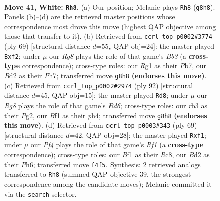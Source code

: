 \documentclass[11pt]{article}
\begin{document}
\begin{figure}[p]\centering
\begin{subfigure}{0.46\textwidth}\centering
\resizebox{\linewidth}{!}{%
\newchessgame
\chessboard[
  setfen={4n1R1/p1p1k3/2P2p2/8/4rP1p/1r6/3B3P/3K1BR1 w - - 0 41},
  showmover=false,
  pgfstyle=straightmove, color=movearrow, markmove={g8-h8}
]}
\caption{}
\end{subfigure}\hfill
\begin{subfigure}{0.46\textwidth}\centering
\resizebox{\linewidth}{!}{%
\newchessgame
\chessboard[
  setfen={8/1p1k3p/1b1r2p1/3P1p2/1P6/1K1P2P1/5NBP/2R5 b - - 0 35},
  showmover=false,
  pgfstyle=straightmove, color=movearrow, markmove={b6-f2}
]}
\caption{}
\end{subfigure}
\\[4pt]
\begin{subfigure}{0.46\textwidth}\centering
\resizebox{\linewidth}{!}{%
\newchessgame
\chessboard[
  setfen={8/6k1/3R1r2/1pn2p1B/p4P1p/P6P/1r4P1/3R2K1 w - - 3 47},
  showmover=false,
  pgfstyle=straightmove, color=movearrow, markmove={d6-d8}
]}
\caption{}
\end{subfigure}\hfill
\begin{subfigure}{0.46\textwidth}\centering
\resizebox{\linewidth}{!}{%
\newchessgame
\chessboard[
  setfen={2r2rk1/8/3p3p/1p2b3/1P1pP3/3N2P1/R5KP/5R2 b - - 4 35},
  showmover=false,
  pgfstyle=straightmove, color=movearrow, markmove={f8-f1}
]}
\caption{}
\end{subfigure}
\caption{\textbf{Move 41, White: \texttt{Rh8}.} (a) Our position; Melanie plays \texttt{Rh8} (\texttt{g8h8}). Panels (b)--(d) are the retrieved master positions whose correspondence most drove this move (highest QAP objective among those that transfer to it). (b) Retrieved from \texttt{ccrl\_top\_p0002\#3774} (ply 69) [structural distance $d$=55, QAP obj=24]: the master played \texttt{Bxf2}; under $\mu$ our \emph{Rg8} plays the role of that game's \emph{Bb3} (a \textbf{cross-type} correspondence); cross-type roles: our \emph{R}g1 as their \emph{P}b7, our \emph{B}d2 as their \emph{P}h7; transferred move \texttt{g8h8} \textbf{(endorses this move)}. (c) Retrieved from \texttt{ccrl\_top\_p0002\#2974} (ply 92) [structural distance $d$=45, QAP obj=15]: the master played \texttt{Rd8}; under $\mu$ our \emph{Rg8} plays the role of that game's \emph{Rd6}; cross-type roles: our \emph{r}b3 as their \emph{P}g2, our \emph{B}f1 as their \emph{p}h4; transferred move \texttt{g8h8} \textbf{(endorses this move)}. (d) Retrieved from \texttt{ccrl\_top\_p0003\#343} (ply 69) [structural distance $d$=42, QAP obj=28]: the master played \texttt{Rxf1}; under $\mu$ our \emph{Pf4} plays the role of that game's \emph{Rf1} (a \textbf{cross-type} correspondence); cross-type roles: our \emph{B}f1 as their \emph{R}c8, our \emph{B}d2 as their \emph{P}h6; transferred move \texttt{f4f5}. Synthesis: 2 retrieved analogs transferred to \texttt{Rh8} (summed QAP objective 39, the strongest correspondence among the candidate moves); Melanie committed it via the \texttt{search} selector.}
\label{fig:thought-m80}
\end{figure}
\end{document}
